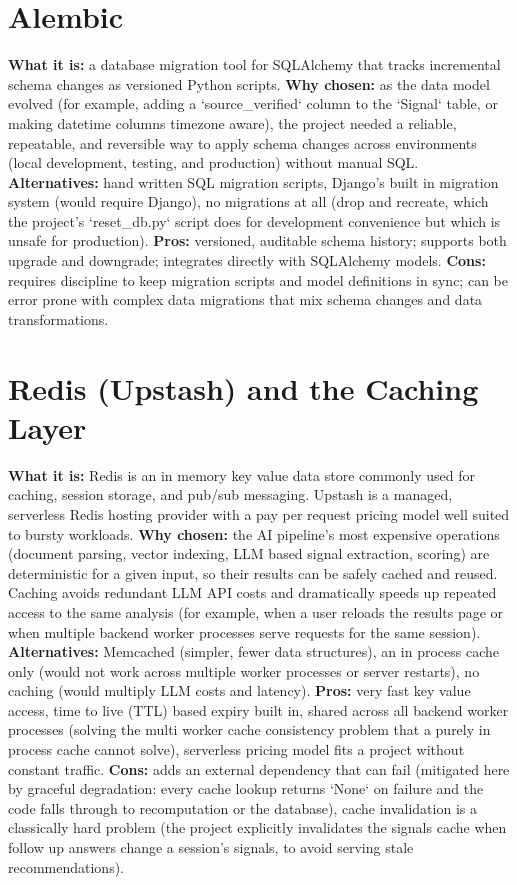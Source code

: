 \documentclass[11pt,a4paper]{report}
\begin{document}
\section{Alembic}
\textbf{What it is:} a database migration tool for SQLAlchemy that tracks incremental schema changes as versioned Python scripts.
\textbf{Why chosen:} as the data model evolved (for example, adding a `source_verified` column to the `Signal` table, or making datetime columns timezone aware), the project needed a reliable, repeatable, and reversible way to apply schema changes across environments (local development, testing, and production) without manual SQL.
\textbf{Alternatives:} hand written SQL migration scripts, Django's built in migration system (would require Django), no migrations at all (drop and recreate, which the project's `reset_db.py` script does for development convenience but which is unsafe for production).
\textbf{Pros:} versioned, auditable schema history; supports both upgrade and downgrade; integrates directly with SQLAlchemy models.
\textbf{Cons:} requires discipline to keep migration scripts and model definitions in sync; can be error prone with complex data migrations that mix schema changes and data transformations.

\section{Redis (Upstash) and the Caching Layer}
\textbf{What it is:} Redis is an in memory key value data store commonly used for caching, session storage, and pub/sub messaging. Upstash is a managed, serverless Redis hosting provider with a pay per request pricing model well suited to bursty workloads.
\textbf{Why chosen:} the AI pipeline's most expensive operations (document parsing, vector indexing, LLM based signal extraction, scoring) are deterministic for a given input, so their results can be safely cached and reused. Caching avoids redundant LLM API costs and dramatically speeds up repeated access to the same analysis (for example, when a user reloads the results page or when multiple backend worker processes serve requests for the same session).
\textbf{Alternatives:} Memcached (simpler, fewer data structures), an in process cache only (would not work across multiple worker processes or server restarts), no caching (would multiply LLM costs and latency).
\textbf{Pros:} very fast key value access, time to live (TTL) based expiry built in, shared across all backend worker processes (solving the multi worker cache consistency problem that a purely in process cache cannot solve), serverless pricing model fits a project without constant traffic.
\textbf{Cons:} adds an external dependency that can fail (mitigated here by graceful degradation: every cache lookup returns `None` on failure and the code falls through to recomputation or the database), cache invalidation is a classically hard problem (the project explicitly invalidates the signals cache when follow up answers change a session's signals, to avoid serving stale recommendations).
\end{document}

